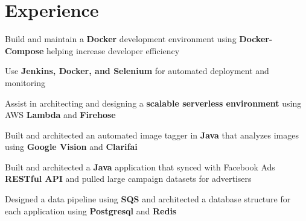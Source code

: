 \documentclass[]{resume}
\begin{document}
\begin{minipage}[t]{0.66\textwidth}


\section{Experience}

\begin{tightemize}
\vspace{\topsep}
\item Build and maintain a \textbf{Docker} development environment using \textbf{Docker-Compose} helping increase developer efficiency
\item Use \textbf{Jenkins, Docker, and Selenium} for automated deployment and monitoring
\item Assist in architecting and designing a \textbf{scalable serverless environment} using AWS \textbf{Lambda} and \textbf{Firehose}
\item Built and architected an automated image tagger in \textbf{Java} that analyzes images using \textbf{Google Vision} and \textbf{Clarifai}
\item Built and architected a \textbf{Java} application that synced with Facebook Ads \textbf{RESTful API} and pulled large campaign datasets for advertisers
\item Designed a data pipeline using \textbf{SQS} and architected a database structure for each application using \textbf{Postgresql} and \textbf{Redis}
\end{tightemize}
\sectionsep




\end{minipage}
\end{document}
